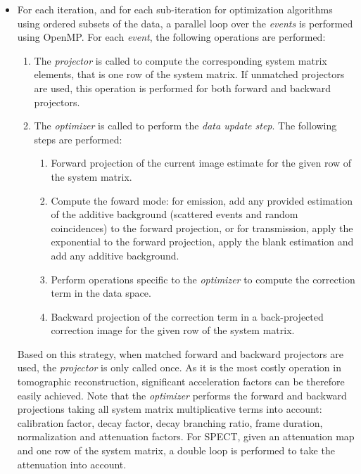 \documentclass[a4paper, 11pt]{article}
\begin{document}
\begin{itemize}
  \item For each iteration, and for each sub-iteration for optimization algorithms using ordered subsets of the data, a parallel loop over the
        \textit{events} is performed using OpenMP.
        For each \textit{event}, the following operations are performed:
        \begin{enumerate}
          \item The \textit{projector} is called to compute the corresponding system matrix elements, that is one row of the system matrix.
                If unmatched projectors are used, this operation is performed for both forward and backward projectors.
          \item The \textit{optimizer} is called to perform the \textit{data update step}. The following steps are performed: 
          \begin{enumerate}
            \item Forward projection of the current image estimate for the given row of the system matrix.
            \item Compute the foward mode: for emission, add any provided estimation of the additive background (scattered events and random coincidences) to the forward projection, or for transmission, apply the exponential to the forward projection, apply the blank estimation and add any additive background.
            \item Perform operations specific to the \textit{optimizer} to compute the correction term in the data space.
            \item Backward projection of the correction term in a back-projected correction image for the given row of the system matrix.
          \end{enumerate}
        \end{enumerate}
        Based on this strategy, when matched forward and backward projectors are used, the \textit{projector} is only called once. 
        As it is the most costly operation in tomographic reconstruction, significant acceleration factors can be therefore easily achieved. 
        Note that the \textit{optimizer} performs the forward and backward projections taking all system matrix multiplicative terms into account:
        calibration factor, decay factor, decay branching ratio, frame duration, normalization and attenuation factors.
        For SPECT, given an attenuation map and one row of the system matrix, a double loop is performed to take the attenuation into account.


\end{itemize}
\end{document}
